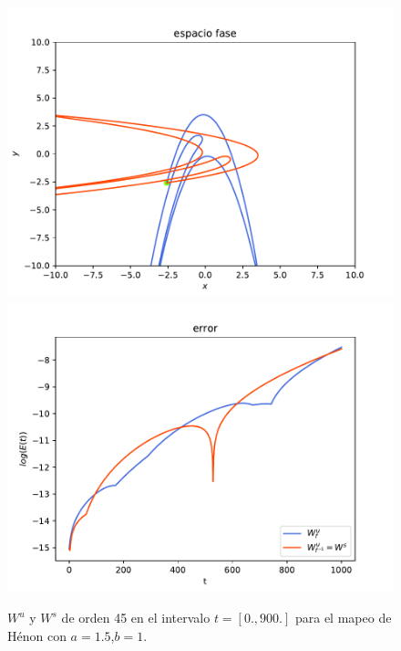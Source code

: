 \documentclass[11pt]{beamer}
\theoremstyle{definition}
\begin{document}
\begin{frame}
\begin{figure}[H]
\centering
\includegraphics[scale=0.35]{h15}
\includegraphics[scale=0.35]{errorH15}
\caption{$W^{u}$ y $W^{s}$ de orden 45 en el intervalo $t=[0.,900.]$ para el mapeo de Hénon con $a=1.5$,$b=1$.}
\label{Henon1}
\end{figure}

\end{frame}
\end{document}
